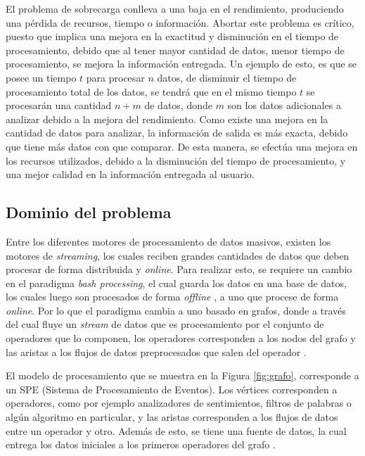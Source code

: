 \documentclass[12pt,letterpaper]{article}
\begin{document}
El problema de sobrecarga conlleva a una baja en el rendimiento, produciendo una pérdida de recursos, tiempo o información. Abortar este problema es cr\'itico, puesto que implica una mejora en la exactitud y disminución en el tiempo de procesamiento, debido que al tener mayor cantidad de datos, menor tiempo de procesamiento, se mejora la información entregada. Un ejemplo de esto, es que se posee un tiempo $t$ para procesar $n$ datos, de disminuir el tiempo de procesamiento total de los datos, se tendrá que en el mismo tiempo $t$ se procesarán una cantidad $n+m$ de datos, donde $m$ son los datos adicionales a analizar debido a la mejora del rendimiento. Como existe una mejora en la cantidad de datos para analizar, la información de salida es más exacta, debido que tiene más datos con que comparar. De esta manera, se efectúa una mejora en los recursos utilizados, debido a la disminución del tiempo de procesamiento, y una mejor calidad en la información entregada al usuario.

\subsection{Dominio del problema}


Entre los diferentes motores de procesamiento de datos masivos, existen los motores de \textsl{streaming}, los cuales reciben grandes cantidades de datos que deben procesar de forma distribuida y \textsl{online}. Para realizar esto, se requiere un cambio en el paradigma \textsl{bash processing}, el cual guarda los datos en una base de datos, los cuales luego son procesados de forma \textsl{offline} \cite{HawwashN14}, a uno que procese de forma \textsl{online}. Por lo que el paradigma cambia a uno basado en grafos, donde a través del cual fluye un \textsl{stream} de datos que es procesamiento por el conjunto de operadores que lo componen, los operadores corresponden a los nodos del grafo y las aristas a los flujos de datos preprocesados que salen del operador \cite{Shahrivari14}.

El modelo de procesamiento que se muestra en la Figura \ref{fig:grafo}, corresponde a un SPE (Sistema de Procesamiento de Eventos). Los vértices corresponden a operadores, como por ejemplo analizadores de sentimientos, filtros de palabras o algún algoritmo en particular, y las aristas corresponden a los flujos de datos entre un operador y otro. Además de esto, se tiene una fuente de datos, la cual entrega los datos iniciales a los primeros operadores del grafo \cite{AppelFFB12}.
\end{document}
